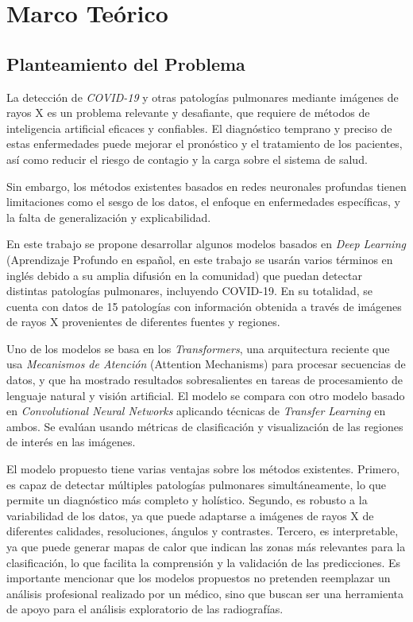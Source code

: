 \chapter{Marco Teórico}

\section{Planteamiento del Problema}

La detección de \textit{COVID-19} y otras patologías pulmonares mediante imágenes de rayos X es un
problema relevante y desafiante, que requiere de métodos de inteligencia artificial eficaces y
confiables. El diagnóstico temprano y preciso de estas enfermedades puede mejorar el pronóstico y
el tratamiento de los pacientes, así como reducir el riesgo de contagio y la carga sobre el sistema
de salud.

Sin embargo, los métodos existentes basados en redes neuronales profundas tienen limitaciones como
el sesgo de los datos, el enfoque en enfermedades específicas, y la falta de generalización y
explicabilidad.

En este trabajo se propone desarrollar algunos modelos basados en \textit{Deep Learning} (Aprendizaje Profundo
en español, en este trabajo se usarán varios términos en inglés debido a su amplia difusión en la comunidad) que
puedan detectar distintas patologías pulmonares, incluyendo COVID-19. En su totalidad, se cuenta con
datos de 15 patologías con información obtenida a través de imágenes de rayos X provenientes de
diferentes fuentes y regiones.

Uno de los modelos se basa en los \textit{Transformers}, una arquitectura reciente que usa
\textit{Mecanismos de Atención} (Attention Mechanisms) para procesar secuencias de datos, y que ha mostrado resultados
sobresalientes en tareas de procesamiento de lenguaje natural y visión artificial. El modelo se
compara con otro modelo basado en \textit{Convolutional Neural Networks} aplicando técnicas de
\emph{Transfer Learning} en ambos. Se evalúan usando métricas de
clasificación y visualización de las regiones de interés en las imágenes.

El modelo propuesto tiene varias ventajas sobre los métodos existentes. Primero, es capaz de
detectar múltiples patologías pulmonares simultáneamente, lo que permite un diagnóstico más
completo y holístico. Segundo, es robusto a la variabilidad de los datos, ya que puede adaptarse a
imágenes de rayos X de diferentes calidades, resoluciones, ángulos y contrastes. Tercero, es
interpretable, ya que puede generar mapas de calor que indican las zonas más relevantes para la
clasificación, lo que facilita la comprensión y la validación de las predicciones. Es importante
mencionar que los modelos propuestos no pretenden reemplazar un análisis profesional realizado por
un médico, sino que buscan ser una herramienta de apoyo para el análisis exploratorio de las
radiografías.

